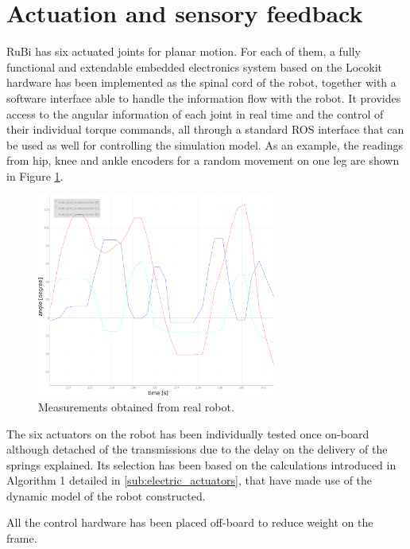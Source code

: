 
\section{Actuation and sensory feedback} %
\label{sec:actuation_and_sensory_feedback}
RuBi has six actuated joints for planar motion.
For each of them, a fully functional and extendable embedded electronics system based on the Locokit hardware has been implemented as the spinal cord of the robot, together with a software interface able to handle the information flow with the robot.
It provides access to the angular information of each joint in real time and the control of their individual torque commands, all through a standard ROS interface that can be used as well for controlling the simulation model.
As an example, the readings from hip, knee and ankle encoders for a random movement on one leg are shown in Figure \ref{fig:position_measurements}.


\begin{figure}[htb]
  \centering
  \includegraphics[width=0.7\textwidth]{figures/position_measurements.pdf}
  \caption{Measurements obtained from real robot.}
  \label{fig:position_measurements}
\end{figure}


The six actuators on the robot has been individually tested once on-board although detached of the transmissions due to the delay on the delivery of the springs explained.
Its selection has been based on the calculations introduced in Algorithm 1 detailed in \ref{sub:electric_actuators}, that have made use of the dynamic model of the robot constructed.

All the control hardware has been placed off-board to reduce weight on the frame.

